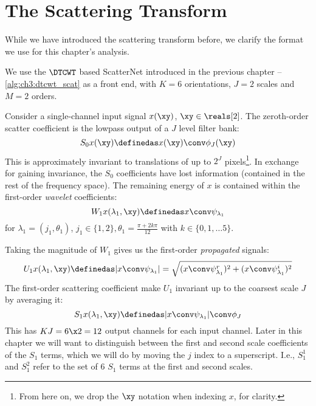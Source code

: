 \section{The Scattering Transform} \label{sec:ch4:scatternet}
While we have introduced the scattering transform before, we clarify the format
we use for this chapter's analysis.

We use the $\DTCWT$ based ScatterNet introduced in the previous chapter --
\autoref{alg:ch3:dtcwt_scat} as a front end, with $K=6$ orientations, $J=2$
scales and $M=2$ orders.

Consider a single-channel input signal $x(\xy)$, $\xy \in \reals[2]$.
The zeroth-order scatter coefficient is the lowpass output of a $J$
level filter bank:
%
\begin{equation}
  S_0x(\xy) \definedas x(\xy) \conv \phi_J(\xy)
\end{equation}
%
This is approximately invariant to translations of up to $2^J$ pixels\footnote{From here on,
we drop the $\xy$ notation when indexing $x$, for clarity.}. In exchange for
gaining invariance, the $S_0$ coefficients have lost information
(contained in the rest of the frequency space). The remaining energy of $x$ is
contained within the first-order \emph{wavelet} coefficients:
\begin{equation}
  W_1x(\lambda_1, \xy) \definedas x \conv \psi_{\lambda_1}
\end{equation}
for $\lambda_1 = (j_1, \theta_1)$, $j_1\in\{1, 2\}, \theta_1 = \frac{\pi +
2k\pi}{12}$ with $k \in \{0, 1, \ldots 5\}$.

Taking the magnitude of $W_1$ gives us the first-order \emph{propagated}
signals:
\begin{equation}
  U_1x(\lambda_1, \xy) \definedas |x \conv \psi_{\lambda_1}|
    = \sqrt{(x \conv \psi^r_{\lambda_1})^2 + (x \conv \psi^i_{\lambda_1})^2}
\end{equation}
The first-order scattering coefficient make $U_1$ invariant up to
the coarsest scale $J$ by averaging it:
\begin{equation}
  S_1x(\lambda_1, \xy) \definedas |x \conv \psi_{\lambda_1}| \conv \phi_J
\end{equation}
This has $KJ = 6\x 2 = 12$ output channels for each input channel. Later in this
chapter we will want to distinguish between the first and second scale
coefficients of the $S_1$ terms, which we will do by moving the $j$ index
to a superscript. I.e., $S_1^1$ and $S_1^2$ refer to the set of 6 $S_1$ terms
at the first and second scales.

